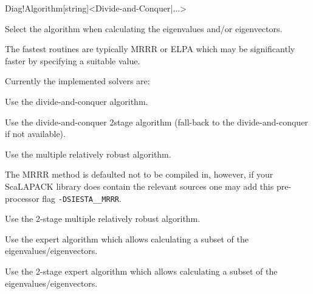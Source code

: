 \begin{fdfentry}{Diag!Algorithm}[string]<Divide-and-Conquer|...>

  Select the algorithm when calculating the eigenvalues and/or
  eigenvectors.

  The fastest routines are typically MRRR or ELPA which may be
  significantly faster by specifying a suitable
   value.

  Currently the implemented solvers are:

  \begin{fdfoptions}

    
    Use the divide-and-conquer algorithm.

    
    Use the divide-and-conquer 2stage algorithm (fall-back to the
    divide-and-conquer if not available).

    
    \option[MRRR]%
    
    Use the multiple relatively robust algorithm.
    
    \note The MRRR method is defaulted not to be compiled in, however,
    if your ScaLAPACK library does contain the relevant sources one
    may add this pre-processor flag \texttt{-DSIESTA\_\_MRRR}.

    
    Use the 2-stage multiple relatively robust algorithm.


    \option[expert]%
    
    Use the expert algorithm which allows calculating a subset of the
    eigenvalues/eigenvectors.



    Use the 2-stage expert algorithm which allows calculating a subset
    of the eigenvalues/eigenvectors.

    
    \option[noexpert|QR]%


\end{fdfoptions}
\end{fdfentry}

